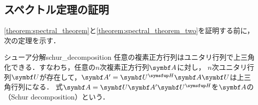 \documentclass[../../main]{subfiles}
\begin{document}
\subsection{スペクトル定理の証明}
\label{subsection:proof_of_the_spectral_theorem}

\cref{theorem:spectral_theorem}と\cref{theorem:spectral_theorem_two}を証明する前に，次の定理を示す．

\begin{theorem}{シューア分解}{schur_decomposition}
  任意の複素正方行列はユニタリ行列で上三角化できる．すなわち，任意の\(n\)次複素正方行列\(\mat{A}\)に対し，
  \(n\)次ユニタリ行列\(\mat{U}\)が存在して，\(\mat{A}'=\htrps{\mat{U}}\mat{A}\mat{U}\)は上三角行列\footnotemark になる．
  式\(\mat{A}=\mat{U}\mat{A}'\htrps{\mat{U}}\)を\(\mat{A}\)の（Schur decomposition）という．
\end{theorem}
\end{document}
